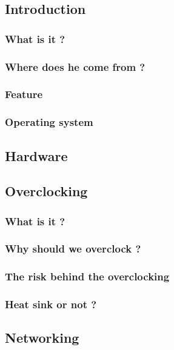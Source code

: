 \documentclass[10pt,a4paper]{article}
\begin{document}
\subsection{Introduction}

\subsubsection{What is it ?}

\subsubsection{Where does he come from ?}

\subsubsection{Feature}

\subsubsection{Operating system}

\subsection{Hardware}

\subsection{Overclocking}

\subsubsection{What is it ?}

\subsubsection{Why should we overclock ?}

\subsubsection{The risk behind the overclocking}

\subsubsection{Heat sink or not ?}

\subsection{Networking}
\end{document}
